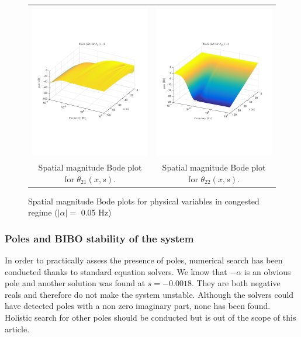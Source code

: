 \documentclass[preprint]{elsarticle}
\begin{document}
\begin{figure}
\begin{tabular}{cc}
\includegraphics[trim = 0mm 60mm 0mm 60mm, width = 8cm]{Bode_congested/distr_theta_21}
&
\includegraphics[trim = 0mm 60mm 0mm 60mm, width = 8cm]{Bode_congested/distr_theta_22}
\tabularnewline
Spatial magnitude Bode plot for $\theta_{21}(x,s)$.
&
Spatial magnitude Bode plot for $\theta_{22}(x,s)$.
\tabularnewline
\end{tabular}
\caption{Spatial magnitude Bode plots for physical variables in congested regime ($\left|\alpha\right| = $ 0.05 Hz)\label{fig:Magn_spatial_physx_congested}}
\end{figure}

\subsubsection{Poles and BIBO stability of the system}
In order to practically assess the presence of poles, numerical search has been conducted thanks to standard equation solvers. We know that $-\alpha$ is an obvious pole and another solution was found at $s=-0.0018$. They are both negative reals and therefore do not make the system unstable. Although the solvers could have detected poles with a non zero imaginary part, none has been found. Holistic search for other poles should be conducted but is out of the scope of this article.
\end{document}
